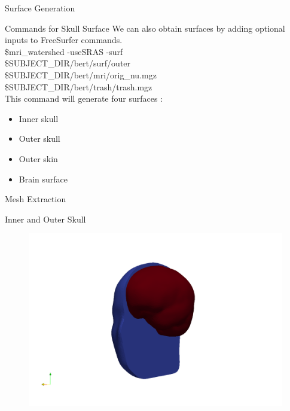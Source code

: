 \documentclass{beamer}
\begin{document}
\begin{frame}{Surface Generation}
\begin{block}{Commands for Skull Surface}
We can also obtain surfaces by adding optional inputs to FreeSurfer commands. \\
\small{
\qquad \$mri\_watershed -useSRAS -surf \\ \hspace{2.5cm} \$SUBJECT\_DIR/bert/surf/outer \\ \hspace{3cm} \$SUBJECT\_DIR/bert/mri/orig\_nu.mgz \\ \hspace{3.5cm} \$SUBJECT\_DIR/bert/trash/trash.mgz 
}
\\ \pause
This command will generate four surfaces : 
\begin{itemize}
\item<2-> Inner skull 
\item<3-> Outer skull
\item<4-> Outer skin
\item<5-> Brain surface
\end{itemize}
\end{block}
\end{frame}

\begin{frame}{Mesh Extraction}
\begin{block}{Inner and Outer Skull}
\begin{figure}
\centering
\includegraphics[scale=0.23]{skull.png} 
\end{figure}
\end{block}
\end{frame}
\end{document}
